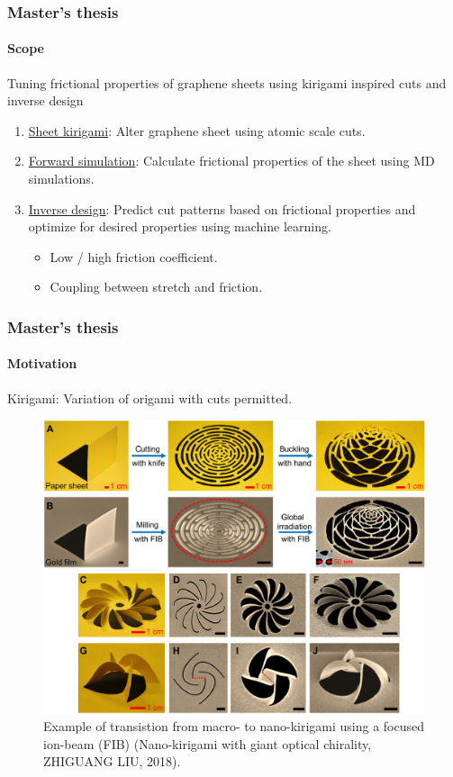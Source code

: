 \documentclass[
	10pt, %
]{beamer}
\begin{document}
\begin{frame}
	\frametitle{Master's thesis}
	\framesubtitle{Scope}

 
	Tuning frictional properties of graphene sheets using kirigami inspired cuts and inverse design
	\newline
	\newline
	


	\begin{enumerate}
		\setlength\itemsep{2em}
		\item \underline{Sheet kirigami}: Alter graphene sheet using atomic scale cuts. %
		\item \underline{Forward simulation}: Calculate frictional properties of the sheet using MD simulations.
		\item \underline{Inverse design}: Predict cut patterns based on frictional properties and optimize for desired properties using machine learning.
		\begin{itemize}
			\item Low / high friction coefficient.
			\item Coupling between stretch and friction.
		\end{itemize} 
	\end{enumerate}

\end{frame}



\begin{frame}
	\frametitle{Master's thesis}
	\framesubtitle{Motivation}

	Kirigami: Variation of origami with cuts permitted.

	\begin{figure}
		\includegraphics[width=0.6\linewidth]{figures/kirigami_example.jpeg}
		\caption{Example of transistion from macro- to nano-kirigami using a focused ion-beam (FIB) (Nano-kirigami with giant optical chirality, ZHIGUANG LIU, 2018).}
	\end{figure}	

\end{frame}
\end{document}
